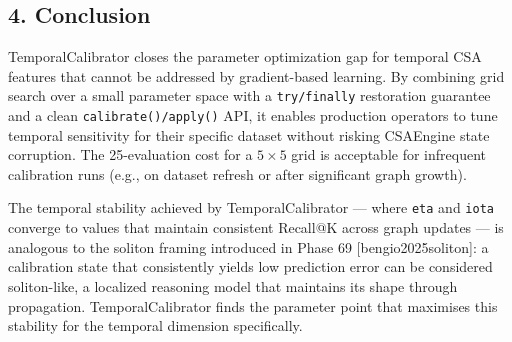 \subsection*{4. Conclusion}
TemporalCalibrator closes the parameter optimization gap for temporal CSA features that cannot be addressed by gradient-based learning. By combining grid search over a small parameter space with a \texttt{try/finally} restoration guarantee and a clean \texttt{calibrate()/apply()} API, it enables production operators to tune temporal sensitivity for their specific dataset without risking CSAEngine state corruption. The 25-evaluation cost for a $5 \times 5$ grid is acceptable for infrequent calibration runs (e.g., on dataset refresh or after significant graph growth).

The temporal stability achieved by TemporalCalibrator --- where \texttt{eta} and \texttt{iota} converge to values that maintain consistent Recall@K across graph updates --- is analogous to the soliton framing introduced in Phase 69 [bengio2025soliton]: a calibration state that consistently yields low prediction error can be considered soliton-like, a localized reasoning model that maintains its shape through propagation. TemporalCalibrator finds the parameter point that maximises this stability for the temporal dimension specifically.